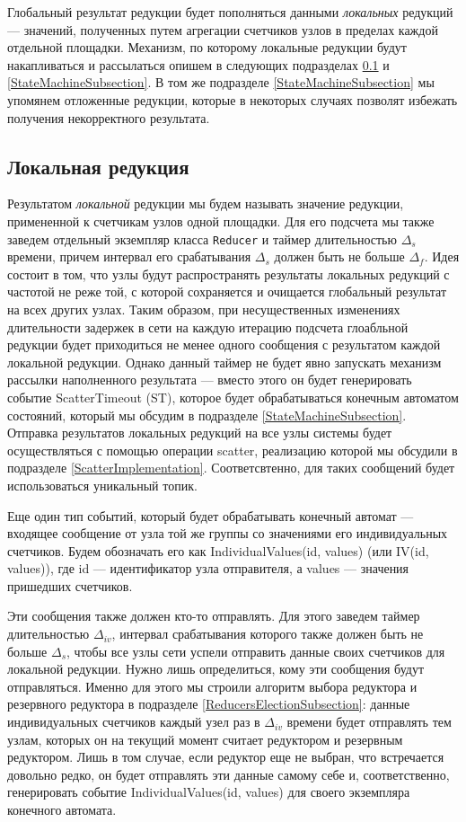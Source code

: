 \documentclass{article}
\theoremstyle{plain}
\theoremstyle{plain}
\theoremstyle{plain}
\theoremstyle{plain}
\theoremstyle{definition}
\theoremstyle{remark}
\theoremstyle{plain}
\begin{document}
Глобальный результат редукции будет пополняться данными \textit{локальных} редукций --- значений, полученных путем агрегации счетчиков узлов в пределах каждой отдельной площадки. Механизм, по которому локальные редукции будут накапливаться и рассылаться опишем в следующих подразделах \ref{LocalReductionsSubection} и \ref{StateMachineSubsection}. В том же подразделе \ref{StateMachineSubsection} мы упомянем отложенные редукции, которые в некоторых случаях позволят избежать получения некорректного результата.

\subsection{Локальная редукция}
\label{LocalReductionsSubection}

Результатом \textit{локальной} редукции мы будем называть значение редукции, примененной к счетчикам узлов одной площадки. Для его подсчета мы также заведем отдельный экземпляр класса \texttt{Reducer} и таймер длительностью $\Delta_s$ времени, причем интервал его срабатывания $\Delta_s$ должен быть не больше $\Delta_f$. Идея состоит в том, что узлы будут распространять результаты локальных редукций с частотой не реже той, с которой сохраняется и очищается глобальный результат на всех других узлах. Таким образом, при несущественных изменениях длительности задержек в сети на каждую итерацию подсчета глоабльной редукции будет приходиться не менее одного сообщения с результатом каждой локальной редукции. Однако данный таймер не будет явно запускать механизм рассылки наполненного результата --- вместо этого он будет генерировать событие ScatterTimeout (ST), которое будет обрабатываться конечным автоматом состояний, который мы обсудим в подразделе \ref{StateMachineSubsection}. Отправка результатов локальных редукций на все узлы системы будет осуществляться с помощью операции scatter, реализацию которой мы обсудили в подразделе \ref{ScatterImplementation}. Соответсвтенно, для таких сообщений будет использоваться уникальный топик.

Еще один тип событий, который будет обрабатывать конечный автомат --- входящее сообщение от узла той же группы со значениями его индивидуальных счетчиков. Будем обозначать его как IndividualValues(id, values) (или IV(id, values)), где id --- идентификатор узла отправителя, а values --- значения пришедших счетчиков.

Эти сообщения также должен кто-то отправлять. Для этого заведем таймер длительностью $\Delta_{iv}$, интервал срабатывания которого также должен быть не больше $\Delta_s$, чтобы все узлы сети успели отправить данные своих счетчиков для локальной редукции. Нужно лишь определиться, кому эти сообщения будут отправляться. Именно для этого мы строили алгоритм выбора редуктора и резервного редуктора в подразделе \ref{ReducersElectionSubsection}: данные индивидуальных счетчиков каждый узел раз в $\Delta_{iv}$ времени будет отправлять тем узлам, которых он на текущий момент считает редуктором и резервным редуктором. Лишь в том случае, если редуктор еще не выбран, что встречается довольно редко, он будет отправлять эти данные самому себе и, соответственно, генерировать событие IndividualValues(id, values) для своего экземпляра конечного автомата.
\end{document}
